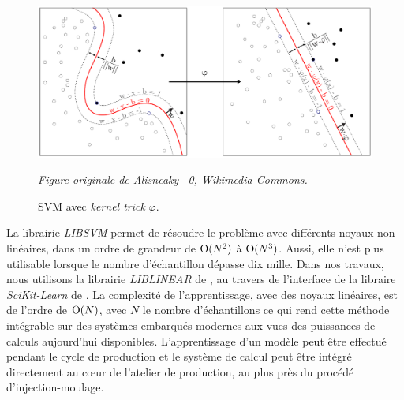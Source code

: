 \begin{figure}[hbtp]
	\centering
	\includegraphics[width=\textwidth,height=\textheight,keepaspectratio]{../Chap4/Figures/Kernel_Machine_Pierre.pdf}
	\caption{SVM avec \emph{kernel trick} $\varphi$.}
	\textit{Figure originale de \href{https://commons.wikimedia.org/wiki/File:Kernel_Machine.png}{Alisneaky \ccLogo \ \textnormal{0}, Wikimedia Commons}.}
	\label{fig:svm}
\end{figure}

La librairie \textit{LIBSVM} \cite{chang_libsvm_2011} permet de résoudre le problème avec différents noyaux non linéaires, dans un ordre de grandeur de $\operatorname{O}(N^2)$ à $\operatorname{O}(N^3)$.
Aussi, elle n'est plus utilisable lorsque le nombre d'échantillon dépasse dix mille.
Dans nos travaux, nous utilisons la librairie \textit{LIBLINEAR} de \citeauthor{fan_liblinear_2008} \cite{fan_liblinear_2008}, au travers de l'interface de la libraire \textit{SciKit-Learn} de \citeauthor{pedregosa_scikit-learn_2011} \cite{pedregosa_scikit-learn_2011}.
La complexité de l'apprentissage, avec des noyaux linéaires, est de l'ordre de $\operatorname{O}(N)$, avec $N$ le nombre d'échantillons ce qui rend cette méthode intégrable sur des systèmes embarqués modernes aux vues des puissances de calculs aujourd'hui disponibles.
L'apprentissage d'un modèle peut être effectué pendant le cycle de production et le système de calcul peut être intégré directement au cœur de l'atelier de production, au plus près du procédé d'injection-moulage.

